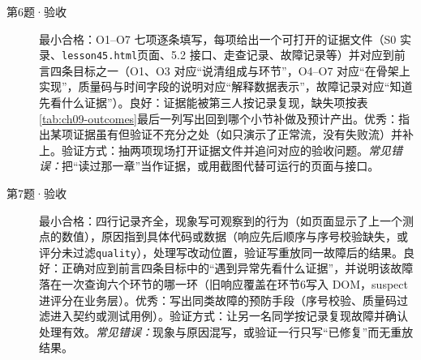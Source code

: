 \begin{description}
  \item[第6题·验收] 最小合格：O1--O7 七项逐条填写，每项给出一个可打开的证据文件（S0 实录、\texttt{lesson45.html}页面、5.2 接口、走查记录、故障记录等）并对应到前言四条目标之一（O1、O3 对应“说清组成与环节”，O4--O7 对应“在骨架上实现”，质量码与时间字段的说明对应“解释数据表示”，故障记录对应“知道先看什么证据”）。良好：证据能被第三人按记录复现，缺失项按表\ref{tab:ch09-outcomes}最后一列写出回到哪个小节补做及预计产出。优秀：指出某项证据虽有但验证不充分之处（如只演示了正常流，没有失败流）并补上。验证方式：抽两项现场打开证据文件并追问对应的验收问题。\textit{常见错误：}把“读过那一章”当作证据，或用截图代替可运行的页面与接口。
  \item[第7题·验收] 最小合格：四行记录齐全，现象写可观察到的行为（如页面显示了上一个测点的数值），原因指到具体代码或数据（响应先后顺序与序号校验缺失，或评分未过滤\texttt{quality}），处理写改动位置，验证写重放同一故障后的结果。良好：正确对应到前言四条目标中的“遇到异常先看什么证据”，并说明该故障落在一次查询六个环节的哪一环（旧响应覆盖在环节6写入 DOM，suspect 进评分在业务层）。优秀：写出同类故障的预防手段（序号校验、质量码过滤进入契约或测试用例）。验证方式：让另一名同学按记录复现故障并确认处理有效。\textit{常见错误：}现象与原因混写，或验证一行只写“已修复”而无重放结果。
\end{description}
